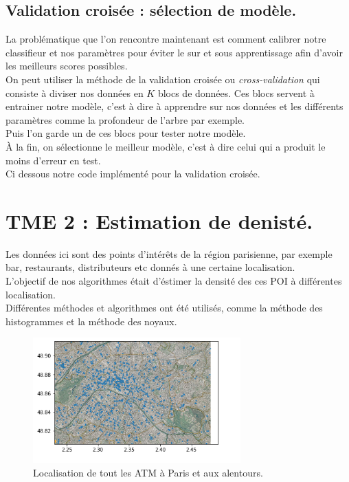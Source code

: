 \documentclass{article}
\begin{document}
\subsection{Validation croisée : sélection de modèle.}
La problématique que l'on rencontre maintenant est comment calibrer notre classifieur et nos paramètres pour éviter le sur et sous apprentissage afin d'avoir les meilleurs scores possibles.\\
On peut utiliser la méthode de la validation croisée  ou \textit{cross-validation} qui consiste à diviser nos données en $K$ blocs de données. Ces blocs servent à entrainer notre modèle, c'est à dire à apprendre sur nos données et les différents paramètres comme la profondeur de l'arbre par exemple.\\ Puis l'on garde un de ces blocs pour tester notre modèle.\\ À la fin, on sélectionne le meilleur modèle, c'est à dire celui qui a produit le moins d'erreur en test.\\ Ci dessous notre code implémenté pour la validation croisée.\\
\section{TME 2 : Estimation de denisté.}
 Les données ici sont des points d'intérêts de la région parisienne, par exemple bar, restaurants, distributeurs etc donnés à une certaine localisation. \\L'objectif de nos algorithmes était d'éstimer la densité des ces POI à différentes localisation.\\ Différentes méthodes et algorithmes ont été utilisés, comme la méthode des histogrammes et la méthode des noyaux.\\
\begin{figure}[h]
	\center
	\includegraphics[width=8cm]{figure/tme2/carteATM.png} 
	 \caption{Localisation de tout les ATM à Paris et aux alentours. }
	 
\end{figure}
\end{document}
